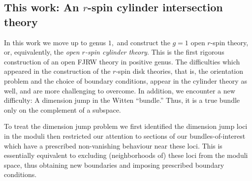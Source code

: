 \documentclass[11pt]{amsart}
\theoremstyle{definition}
\theoremstyle{remark}
\newcommand{\<}{\left<}
\renewcommand{\>}{\right>}
\numberwithin{equation}{section}
\begin{document}
\subsection{This work: An $r$-spin cylinder intersection theory}
In this work we move up to genus $1,$ and construct the $g=1$ open $r$-spin %
theory, or, equivalently, the %
\emph{open $r$-spin cylinder theory}. This is the first rigorous construction of an open FJRW theory in positive genus.
The difficulties which appeared in the construction of the $r$-spin disk theories, %
that is, the %
orientation problem and the choice of boundary conditions, appear in the cylinder theory as well, and are more challenging to overcome. In addition, we encounter a new %
difficulty: A dimension %
jump in the %
Witten ``bundle.'' Thus, %
it is a true bundle only on the complement of a subspace.

To treat the dimension jump problem we first identified the dimension jump loci in %
the moduli then %
restricted our attention to sections of our bundles-of-interest which have a %
prescribed non-vanishing behaviour %
near these loci.
This is essentially equivalent to %
excluding (neighborhoods of) %
these loci from the moduli space, thus obtaining %
new boundaries and %
imposing prescribed boundary conditions.
 
\end{document}
